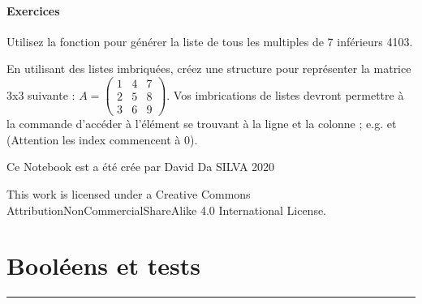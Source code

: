 \documentclass[letterpaper,10pt,english]{sphinxmanual}
\begin{document}
\subsubsection{Exercices}
\label{\detokenize{src/OCI02_Listes:id5}}
Utilisez la fonction  pour générer la liste de tous les multiples de 7 inférieurs 4103.

En utilisant des listes imbriquées, créez une structure pour représenter la matrice 3x3 suivante : \(A=\begin{pmatrix}1&4&7\\2&5&8\\3&6&9\end{pmatrix}\).
Vos imbrications de listes devront permettre à la commande  d’accéder à l’élément se trouvant à la ligne  et la colonne  ; e.g.  et  (Attention les index commencent à 0).

\begin{sphinxVerbatim}[commandchars=\\\{\}]
  \PYG{p}{[}\PYG{p}{[}\PYG{p}{]}\PYG{p}{[}\PYG{p}{]}\PYG{p}{[}\PYG{p}{]}\PYG{p}{]}
\PYG{p}{[}\PYG{p}{]}\PYG{p}{[}\PYG{p}{]}
\PYG{p}{[}\PYG{p}{]}\PYG{p}{[}\PYG{p}{]}
\end{sphinxVerbatim}

Ce Notebook est a été crée par David Da SILVA \sphinxhyphen{} 2020

This work is licensed under a Creative Commons Attribution\sphinxhyphen{}NonCommercial\sphinxhyphen{}ShareAlike 4.0 International License.


\chapter{Booléens et tests}
\label{\detokenize{src/OCI03_Booleans_IfBlock:booleens-et-tests}}\label{\detokenize{src/OCI03_Booleans_IfBlock::doc}}

\bigskip\hrule\bigskip
\end{document}
